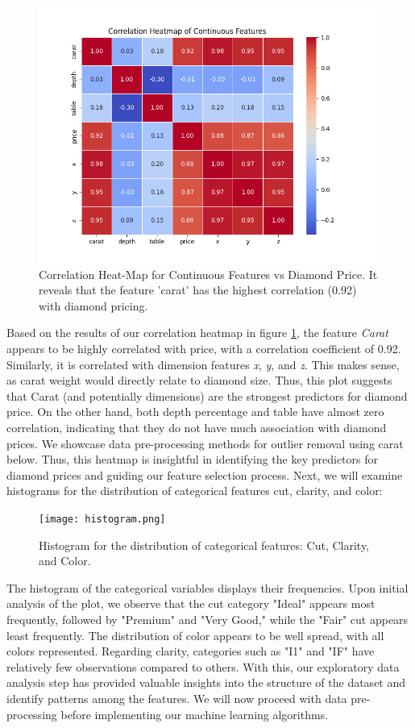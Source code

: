 \documentclass[conference]{IEEEtran}
\begin{document}
\begin{figure}[H]
    \centering
    \includegraphics[width=0.7\linewidth]{correlation.png} %
    \caption{Correlation Heat-Map for Continuous Features vs Diamond Price. It reveals that the feature 'carat' has the highest correlation (0.92) with diamond pricing.}
    \label{fig:corr}
\end{figure}

Based on the results of our correlation heatmap in figure \ref{fig:corr}, the feature \emph{Carat} appears to be highly correlated with price, with a correlation coefficient of 0.92. Similarly, it is correlated with dimension features \emph{x}, \emph{y}, and \emph{z}. This makes sense, as carat weight would directly relate to diamond size. Thus, this plot suggests that Carat (and potentially dimensions) are the strongest predictors for diamond price. On the other hand, both depth percentage and table have almost zero correlation, indicating that they do not have much association with diamond prices. We showcase data pre-processing methods for outlier removal using carat below. Thus, this heatmap is insightful in identifying the key predictors for diamond prices and guiding our feature selection process. Next, we will examine histograms for the distribution of categorical features cut, clarity, and color:

\begin{figure}[H]
    \centering
    \texttt{[image: histogram.png]} 
    \caption{Histogram for the distribution of categorical features: Cut, Clarity, and Color.}
    \label{fig:histogram}
\end{figure}

The histogram of the categorical variables displays their frequencies. Upon initial analysis of the plot, we observe that the cut category "Ideal" appears most frequently, followed by "Premium" and "Very Good," while the "Fair" cut appears least frequently. The distribution of color appears to be well spread, with all colors represented. Regarding clarity, categories such as "I1" and "IF" have relatively few observations compared to others. With this, our exploratory data analysis step has provided valuable insights into the structure of the dataset and identify patterns among the features. We will now proceed with data pre-processing before implementing our machine learning algorithms.
\end{document}

